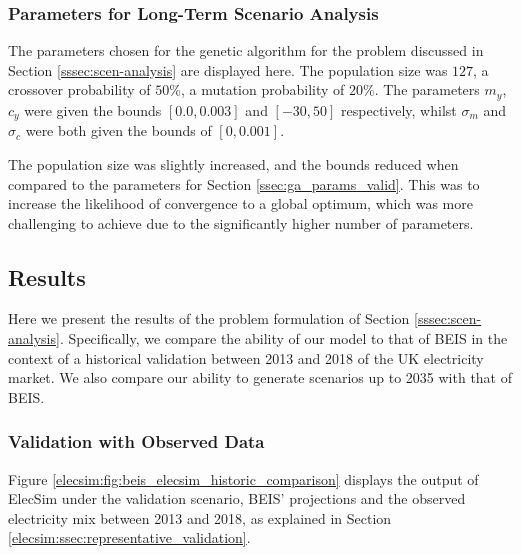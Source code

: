 \subsubsection{Parameters for Long-Term Scenario Analysis}

The parameters chosen for the genetic algorithm for the problem discussed in Section \ref{sssec:scen-analysis} are displayed here. The population size was $127$, a crossover probability of $50\%$, a mutation probability of $20\%$. The parameters $m_y$, $c_y$ were given the bounds $[0.0, 0.003]$ and $[-30, 50]$ respectively, whilst $\sigma_m$ and $\sigma_c$ were both given the bounds of $[0, 0.001]$.

The population size was slightly increased, and the bounds reduced when compared to the parameters for Section \ref{ssec:ga_params_valid}. This was to increase the likelihood of convergence to a global optimum, which was more challenging to achieve due to the significantly higher number of parameters.


\subsection{Results}
\label{sec:results}

Here we present the results of the problem formulation of Section \ref{sssec:scen-analysis}. Specifically, we compare the ability of our model to that of BEIS in the context of a historical validation between 2013 and 2018 of the UK electricity market. We also compare our ability to generate scenarios up to 2035 with that of BEIS. 

\subsubsection{Validation with Observed Data}

Figure \ref{elecsim:fig:beis_elecsim_historic_comparison} displays the output of ElecSim under the validation scenario, BEIS' projections and the observed electricity mix between 2013 and 2018, as explained in Section \ref{elecsim:ssec:representative_validation}.

